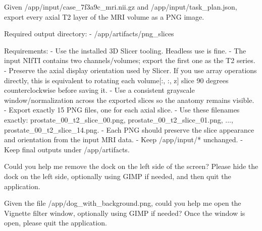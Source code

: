 \begin{instructionbox}
Given \textasciigrave{}/app/input/case\_7f3a9c\_mri.nii.gz\textasciigrave{} and \textasciigrave{}/app/input/task\_plan.json\textasciigrave{}, export every axial T2 layer of the MRI volume as a PNG image.

Required output directory:
- \textasciigrave{}/app/artifacts/png\_slices\textasciigrave{}

Requirements:
- Use the installed 3D Slicer tooling. Headless use is fine.
- The input NIfTI contains two channels/volumes; export the first one as the T2 series.
- Preserve the axial display orientation used by Slicer. If you use array operations directly, this is equivalent to rotating each \textasciigrave{}volume[:, :, z]\textasciigrave{} slice 90 degrees counterclockwise before saving it.
- Use a consistent grayscale window/normalization across the exported slices so the anatomy remains visible.
- Export exactly 15 PNG files, one for each axial slice.
- Use these filenames exactly: \textasciigrave{}prostate\_00\_t2\_slice\_00.png\textasciigrave{}, \textasciigrave{}prostate\_00\_t2\_slice\_01.png\textasciigrave{}, ..., \textasciigrave{}prostate\_00\_t2\_slice\_14.png\textasciigrave{}.
- Each PNG should preserve the slice appearance and orientation from the input MRI data.
- Keep \textasciigrave{}/app/input/*\textasciigrave{} unchanged.
- Keep final outputs under \textasciigrave{}/app/artifacts\textasciigrave{}.
\end{instructionbox}

\begin{instructionbox}
Could you help me remove the dock on the left side of the screen? Please hide the dock on the left side, optionally using GIMP if needed, and then quit the application.
\end{instructionbox}

\begin{instructionbox}
Given the file \textasciigrave{}/app/dog\_with\_background.png\textasciigrave{}, could you help me open the Vignette filter window, optionally using GIMP if needed? Once the window is open, please quit the application.
\end{instructionbox}

